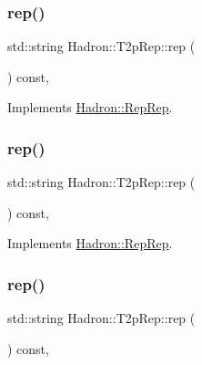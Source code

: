 \subsubsection{\texorpdfstring{rep()}{rep()}\hspace{0.1cm}{\footnotesize\ttfamily [1/3]}}
{\footnotesize\ttfamily std\+::string Hadron\+::\+T2p\+Rep\+::rep (\begin{DoxyParamCaption}{ }\end{DoxyParamCaption}) const\hspace{0.3cm}{\ttfamily [inline]}, {\ttfamily [virtual]}}



Implements \mbox{\hyperlink{structHadron_1_1RepRep_ab3213025f6de249f7095892109575fde}{Hadron\+::\+Rep\+Rep}}.

\mbox{\label{structHadron_1_1T2pRep_abf712164cb437c03107c2467574b32c1}} 
\subsubsection{\texorpdfstring{rep()}{rep()}\hspace{0.1cm}{\footnotesize\ttfamily [2/3]}}
{\footnotesize\ttfamily std\+::string Hadron\+::\+T2p\+Rep\+::rep (\begin{DoxyParamCaption}{ }\end{DoxyParamCaption}) const\hspace{0.3cm}{\ttfamily [inline]}, {\ttfamily [virtual]}}



Implements \mbox{\hyperlink{structHadron_1_1RepRep_ab3213025f6de249f7095892109575fde}{Hadron\+::\+Rep\+Rep}}.

\mbox{\label{structHadron_1_1T2pRep_abf712164cb437c03107c2467574b32c1}} 
\subsubsection{\texorpdfstring{rep()}{rep()}\hspace{0.1cm}{\footnotesize\ttfamily [3/3]}}
{\footnotesize\ttfamily std\+::string Hadron\+::\+T2p\+Rep\+::rep (\begin{DoxyParamCaption}{ }\end{DoxyParamCaption}) const\hspace{0.3cm}{\ttfamily [inline]}, {\ttfamily [virtual]}}



